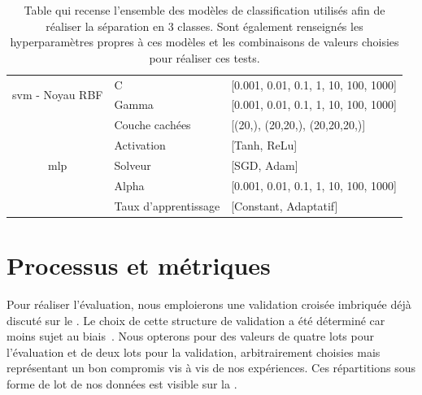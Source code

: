 \begin{table}[H]
\begin{tabular}{cll}
        \multirow{2}{*}{\gls{svm} - Noyau RBF}          & C                         & [0.001, 0.01, 0.1, 1, 10, 100, 1000]      \\ \cmidrule{2-3}   
                                                        & Gamma                     & [0.001, 0.01, 0.1, 1, 10, 100, 1000]      \\ \midrule 
        \multirow{5}{*}{\gls{mlp}}                      & Couche cachées            & [(20,), (20,20,), (20,20,20,)]            \\ \cmidrule{2-3}
                                                        & Activation                & [Tanh, ReLu]                              \\ \cmidrule{2-3}
                                                        & Solveur                   & [SGD, Adam]                               \\ \cmidrule{2-3}
                                                        & Alpha                     & [0.001, 0.01, 0.1, 1, 10, 100, 1000]      \\ \cmidrule{2-3}
                                                        & Taux d'apprentissage      & [Constant, Adaptatif]                     \\ \bottomrule 
    \end{tabular} 
    \label{tab:image_hyperparameters}
    \caption{Table qui recense l'ensemble des modèles de classification utilisés afin de réaliser la séparation en 3 classes. Sont également renseignés les hyperparamètres propres à ces modèles et les combinaisons de valeurs choisies pour réaliser ces tests.}
\end{table}\par

\section{Processus et métriques}
Pour réaliser l'évaluation, nous emploierons une validation croisée imbriquée déjà discuté sur le . Le choix de cette structure de validation a été déterminé car moins sujet au biais~\cite{Cawley2010}. Nous opterons pour des valeurs de quatre lots pour l'évaluation et de deux lots pour la validation, arbitrairement choisies mais représentant un bon compromis vis à vis de nos expériences. Ces répartitions sous forme de lot de nos données est visible sur la .\par

